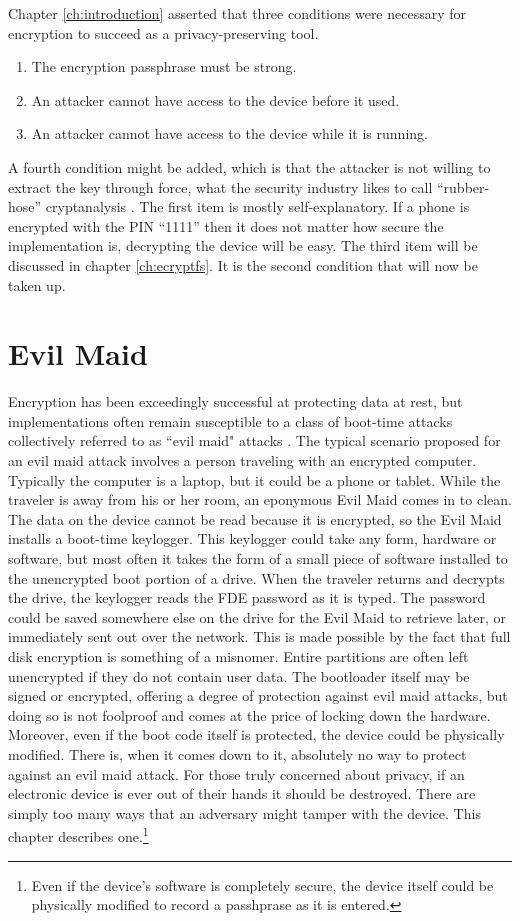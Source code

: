 Chapter \ref{ch:introduction} asserted that three conditions were necessary for encryption to succeed as a privacy-preserving tool.
\begin{enumerate}
	\item{The encryption passphrase must be strong.}
	\item{An attacker cannot have access to the device before it used.}
	\item{An attacker cannot have access to the device while it is running.}
\end{enumerate}
A fourth condition might be added, which is that the attacker is not willing to extract the key through force, what the security
industry likes to call ``rubber-hose'' cryptanalysis \cite{rubberhose}.  The first item is mostly self-explanatory. If a phone is
encrypted with the PIN ``1111'' then it does not matter how secure the implementation is, decrypting the device will be easy. The
third item will be discussed in chapter \ref{ch:ecryptfs}.  It is the second condition that will now be taken up. 

\section{Evil Maid}
Encryption has been exceedingly successful at protecting data at rest, but implementations often remain susceptible to a class of
boot-time attacks collectively referred to as ``evil maid" attacks \cite{schneiermaid}. The typical scenario proposed for an evil
maid attack involves a person traveling with an encrypted computer. Typically the computer is a laptop, but it could be a phone or
tablet.  While the traveler is away from his or her room, an eponymous Evil Maid comes in to clean. The data on the device cannot be
read because it is encrypted, so the Evil Maid installs a boot-time keylogger. This keylogger could take any form, hardware or
software, but most often it takes the form of a small piece of software installed to the unencrypted boot portion of a drive. When
the traveler returns and decrypts the drive, the keylogger reads the FDE password as it is typed. The password could be saved
somewhere else on the drive for the Evil Maid to retrieve later, or immediately sent out over the network.  This is made possible by
the fact that full disk encryption is something of a misnomer.  Entire partitions are often left unencrypted if they do not contain
user data.  The bootloader itself may be signed or encrypted, offering a degree of protection against evil maid attacks, but doing
so is not foolproof \cite{attackingbitlocker} and comes at the price of locking down the hardware. Moreover, even if the boot code
itself is protected, the device could be physically modified. There is, when it comes down to it, absolutely no way to protect
against an evil maid attack.  For those truly concerned about privacy, if an electronic device is ever out of their hands it should
be destroyed. There are simply too many ways that an adversary might tamper with the device. This chapter describes
one.\footnote{Even if the device's software is completely secure, the device itself could be physically modified to record a
passhprase as it is entered.}

